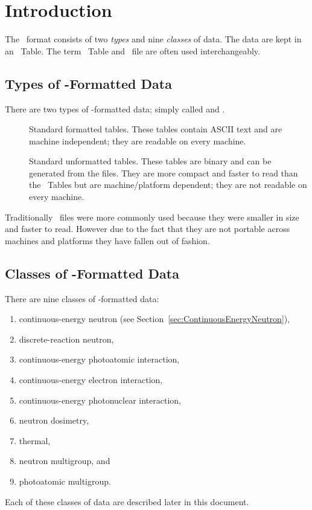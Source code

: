 \section{Introduction}\label{sec:Introduction}
The \ACE\ format consists of two \emph{types} and nine \emph{classes} of data. The data are kept in an \ACE\ Table. The term \ACE\ Table and \ACE\ file are often used interchangeably.

\subsection{Types of \ACE-Formatted Data}
There are two types of \ACE-formatted data; simply called  and .
\begin{description}
  \item[] Standard formatted tables. These tables contain ASCII text and are machine independent; they are readable on every machine. 
  \item[] Standard unformatted tables. These tables are binary and can be generated from the  files. They are more compact and faster to read than the  \ACE\ Tables
 but are machine/platform dependent; they are not readable on every machine. 
\end{description}
Traditionally
  \ACE\ files were more commonly used because they were smaller in size and faster to read. However
 due to the fact that they are not portable across machines and platforms they have fallen out of fashion.

\subsection{Classes of \ACE-Formatted Data}
There are nine classes of \ACE-formatted data:
\begin{enumerate}
  \item continuous-energy neutron (see Section~\ref{sec:ContinuousEnergyNeutron}),
  \item discrete-reaction neutron,
  \item continuous-energy photoatomic interaction,
  \item continuous-energy electron interaction,
  \item continuous-energy photonuclear interaction,
  \item neutron dosimetry,
  \item \SaB thermal,
  \item neutron multigroup, and
  \item photoatomic multigroup.
\end{enumerate}
Each of these classes of data are described later in this document.

